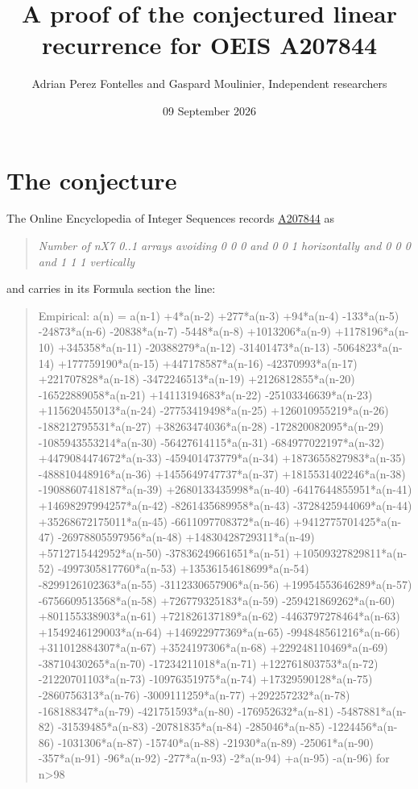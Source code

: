 \documentclass[11pt]{article}
\title{A proof of the conjectured linear recurrence for OEIS A207844}
\author{Adrian Perez Fontelles and Gaspard Moulinier, Independent researchers}
\date{09 September 2026}
\theoremstyle{definition}
\begin{document}
\maketitle
\section{The conjecture}

The Online Encyclopedia of Integer Sequences records \href{https://oeis.org/A207844}{A207844} as

\begin{quote}\itshape Number of nX7 0..1 arrays avoiding 0 0 0 and 0 0 1 horizontally and 0 0 0 and 1 1 1 vertically\end{quote}

and carries in its Formula section the line:

\begin{quote}\ttfamily Empirical: a(n) = a(n-1) +4*a(n-2) +277*a(n-3) +94*a(n-4) -133*a(n-5) -24873*a(n-6) -20838*a(n-7) -5448*a(n-8) +1013206*a(n-9) +1178196*a(n-10) +345358*a(n-11) -20388279*a(n-12) -31401473*a(n-13) -5064823*a(n-14) +177759190*a(n-15) +447178587*a(n-16) -42370993*a(n-17) +221707828*a(n-18) -3472246513*a(n-19) +2126812855*a(n-20) -16522889058*a(n-21) +14113194683*a(n-22) -25103346639*a(n-23) +115620455013*a(n-24) -27753419498*a(n-25) +126010955219*a(n-26) -188212795531*a(n-27) +38263474036*a(n-28) -172820082095*a(n-29) -1085943553214*a(n-30) -56427614115*a(n-31) -684977022197*a(n-32) +4479084474672*a(n-33) -459401473779*a(n-34) +1873655827983*a(n-35) -488810448916*a(n-36) +1455649747737*a(n-37) +1815531402246*a(n-38) -19088607418187*a(n-39) +2680133435998*a(n-40) -6417644855951*a(n-41) +14698297994257*a(n-42) -8261435689958*a(n-43) -3728425944069*a(n-44) +35268672175011*a(n-45) -6611097708372*a(n-46) +9412775701425*a(n-47) -26978805597956*a(n-48) +14830428729311*a(n-49) +5712715442952*a(n-50) -37836249661651*a(n-51) +10509327829811*a(n-52) -4997305817760*a(n-53) +13536154618699*a(n-54) -8299126102363*a(n-55) -3112330657906*a(n-56) +19954553646289*a(n-57) -6756609513568*a(n-58) +726779325183*a(n-59) -259421869262*a(n-60) +801155338903*a(n-61) +721826137189*a(n-62) -4463797278464*a(n-63) +1549246129003*a(n-64) +146922977369*a(n-65) -994848561216*a(n-66) +311012884307*a(n-67) +3524197306*a(n-68) +229248110469*a(n-69) -38710430265*a(n-70) -17234211018*a(n-71) +122761803753*a(n-72) -21220701103*a(n-73) -10976351975*a(n-74) +17329590128*a(n-75) -2860756313*a(n-76) -3009111259*a(n-77) +292257232*a(n-78) -168188347*a(n-79) -421751593*a(n-80) -176952632*a(n-81) -5487881*a(n-82) -31539485*a(n-83) -20781835*a(n-84) -285046*a(n-85) -1224456*a(n-86) -1031306*a(n-87) -15740*a(n-88) -21930*a(n-89) -25061*a(n-90) -357*a(n-91) -96*a(n-92) -277*a(n-93) -2*a(n-94) +a(n-95) -a(n-96) for n>98\end{quote}
\end{document}
